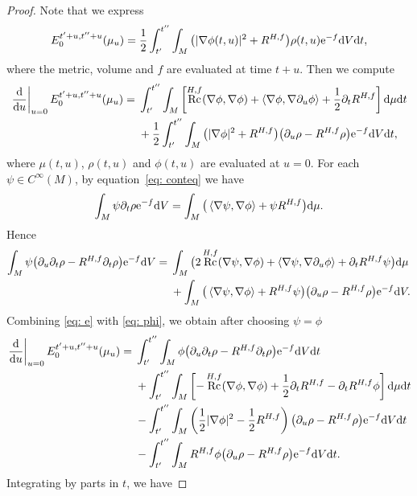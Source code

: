 \documentclass[pdftex]{sigma}
\numberwithin{equation}{section}
\newcommand{\del}{\partial}
\newcommand{\N}{\nabla}
\newcommand{\IP}[1]{\left<#1\right>}
\DeclareMathOperator{\Rc}{Rc}
\begin{document}
\begin{proof}
Note that we express
\begin{align*}
E_0^{t'+u,t''+u}(\mu_u)=\frac12\int_{t'}^{t''}\int_M \big(|\N\phi(t,u)|^2+R^{H,f}\big)\rho(t,u){\rm e}^{-f} {\rm d}V{\rm d}t,
\end{align*}
where the metric, volume and $f$ are evaluated at time $t+u$. Then we compute
\begin{align}
\left. \frac{{\rm d}}{{\rm d}u} \right|_{u=0} E_0^{t'+u,t''+u}(\mu_u)={}&\int_{t'}^{t''}\int_M \left[ \Rc^{H,f}(\N\phi,\N\phi) + \IP{\N\phi,\N\del_u\phi}+\frac12\del_t R^{H,f} \right] {\rm d}\mu {\rm d}t\nonumber\\
& +\frac12\int_{t'}^{t''}\int_M \big(|\N\phi|^2+R^{H,f}\big)\big(\del_u\rho-R^{H,f}\rho\big) {\rm e}^{-f} {\rm d}V{\rm d}t,\label{eq: e}
\end{align}
where $\mu(t,u)$, $\rho(t,u)$ and $\phi(t,u)$ are evaluated at $u=0$.
For each $\psi\in C^{\infty}(M)$, by equation~\eqref{eq: conteq} we have
\begin{align*}
\int_M \psi\del_t\rho {\rm e}^{-f} {\rm d}V=\int_M \big(\IP{\N\psi,\N\phi}+\psi R^{H,f}\big) {\rm d}\mu.
\end{align*}
Hence
\begin{align}
\int_M \psi\big(\del_u\del_t\rho-R^{H,f}\del_t\rho\big){\rm e}^{-f} {\rm d}V
={}&\int_M \big(2\Rc^{H,f}(\N\psi,\N\phi) + \IP{\N\psi,\N\del_u\phi}+\del_tR^{H,f}\psi\big) {\rm d}\mu\nonumber\\
& + \int_M \big(\IP{\N\psi,\N\phi}+R^{H,f}\psi\big)\big(\del_u\rho-R^{H,f}\rho\big){\rm e}^{-f} {\rm d}V.\label{eq: phi}
\end{align}
Combining
\eqref{eq: e} with \eqref{eq: phi}, we obtain after choosing $\psi=\phi$
\begin{align*}
\left. \frac{{\rm d}}{{\rm d}u} \right|_{u=0} E_0^{t'+u,t''+u}(\mu_u)={}&\int_{t'}^{t''}\int_M \phi\big(\del_u\del_t\rho-R^{H,f}\del_t\rho\big){\rm e}^{-f} {\rm d}V{\rm d}t\\
&+\int_{t'}^{t''}\int_M \left[ - \Rc^{H,f}(\N\phi,\N\phi) + \frac{1}{2} \del_t R^{H,f} - \del_t R^{H,f} \phi \right] {\rm d}\mu {\rm d}t\\
&-\int_{t'}^{t''}\int_M \left( \frac12|\N\phi|^2-\frac12 R^{H,f} \right)\big(\del_u\rho-R^{H,f}\rho\big) {\rm e}^{-f} {\rm d}V{\rm d}t\\
&-\int_{t'}^{t''}\int_M R^{H,f}\phi\big(\del_u\rho-R^{H,f}\rho\big) {\rm e}^{-f} {\rm d}V{\rm d}t.
\end{align*}
Integrating by parts in $t$, we have

\end{proof}
\end{document}

